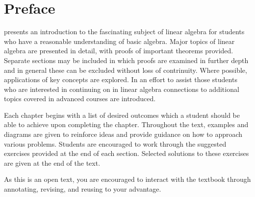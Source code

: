 \chapter*{Preface}

\textit{\bookfulltitle} presents an introduction to the fascinating subject of linear algebra for students who have a reasonable understanding of basic algebra. Major topics of linear algebra are presented in detail, with proofs of important theorems provided. Separate sections may be included in which proofs are examined in further depth and in general these can be excluded without loss of contrinuity. Where possible, applications of key concepts are explored. In an effort to assist those students who are interested in continuing on in linear algebra connections to additional topics covered in advanced courses are introduced.

Each chapter begins with a list of desired outcomes which a student should be able to achieve upon completing the chapter.  Throughout the text, examples
and diagrams are given to reinforce ideas and provide guidance on how
to approach various problems. Students are encouraged to work through the suggested exercises provided at the end of each section. Selected solutions to these exercises are given at the end of the text. 

As this is an open text, you are encouraged to interact with the textbook through annotating, revising, and reusing to your advantage. 
